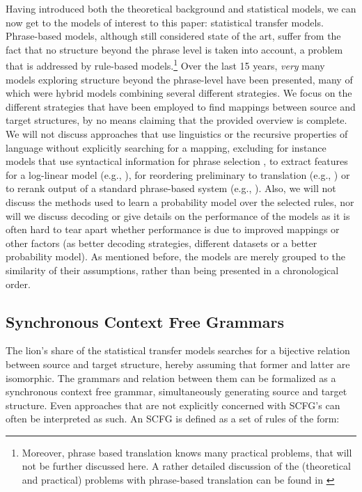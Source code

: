 \documentclass[a4paper, 11pt]{report}
\theoremstyle{definition}
\theoremstyle{plain}
\begin{document}
Having introduced both the theoretical background and statistical models, we can now get to the models of interest to this paper: statistical transfer models. Phrase-based models, although still considered state of the art, suffer from the fact that no structure beyond the phrase level is taken into account, a problem that is addressed by rule-based models.\footnote{Moreover, phrase based translation knows many practical problems, that will not be further discussed here. A rather detailed discussion of the (theoretical and practical) problems with phrase-based translation can be found in \cite{quirk2006we}} Over the last 15 years, \textit{very} many models exploring structure beyond the phrase-level have been presented, many of which were hybrid models combining several different strategies. We focus on the different strategies that have been employed to find mappings between source and target structures, by no means claiming that the provided overview is complete. We will not discuss approaches that use linguistics or the recursive properties of language without explicitly searching for a mapping, excluding for instance models that use syntactical information for phrase selection \citep{koehn2003statistical}, to extract features for a log-linear model (e.g., \cite{cherry2013improved,liu2010semantic}), for reordering preliminary to translation (e.g., \cite{khalilov2012statistical}) or to rerank output of a standard phrase-based system (e.g., \cite{och2004smorgasbord}). Also, we will not discuss the methods used to learn a probability model over the selected rules, nor will we discuss decoding or give details on the performance of the models as it is often hard to tear apart whether performance is due to improved mappings or other factors (as better decoding strategies, different datasets or a better probability model). As mentioned before, the models are merely grouped to the similarity of their assumptions, rather than being presented in a chronological order.

\subsection{Synchronous Context Free Grammars}
The lion's share of the statistical transfer models searches for a bijective relation between source and target structure, hereby assuming that former and latter are isomorphic. The grammars and relation between them can be formalized as a synchronous context free grammar, simultaneously generating source and target structure. Even approaches that are not explicitly concerned with SCFG's can often be interpreted as such. An SCFG is defined as a set of rules of the form:
\end{document}

